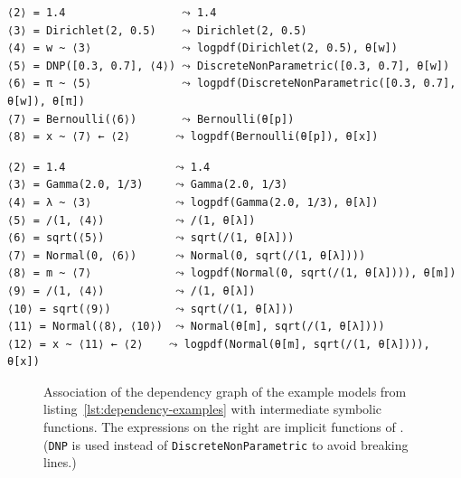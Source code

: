 \newsavebox{\bmlikelihoods}
\begin{lrbox}{\bmlikelihoods}
\begin{lstlisting}[style=lstfloat]
⟨2⟩ = 1.4                  ⤳ 1.4
⟨3⟩ = Dirichlet(2, 0.5)    ⤳ Dirichlet(2, 0.5)
⟨4⟩ = w ~ ⟨3⟩              ⤳ logpdf(Dirichlet(2, 0.5), θ[w])
⟨5⟩ = DNP([0.3, 0.7], ⟨4⟩) ⤳ DiscreteNonParametric([0.3, 0.7], θ[w])
⟨6⟩ = π ~ ⟨5⟩              ⤳ logpdf(DiscreteNonParametric([0.3, 0.7], θ[w]), θ[π])
⟨7⟩ = Bernoulli(⟨6⟩)       ⤳ Bernoulli(θ[p])
⟨8⟩ = x ~ ⟨7⟩ ← ⟨2⟩       ⤳ logpdf(Bernoulli(θ[p]), θ[x])
\end{lstlisting}
\end{lrbox}
\newsavebox{\hglikelihoods}
\begin{lrbox}{\hglikelihoods}
\begin{lstlisting}[style=lstfloat]
⟨2⟩ = 1.4                 ⤳ 1.4
⟨3⟩ = Gamma(2.0, 1/3)     ⤳ Gamma(2.0, 1/3)
⟨4⟩ = λ ~ ⟨3⟩             ⤳ logpdf(Gamma(2.0, 1/3), θ[λ])
⟨5⟩ = /(1, ⟨4⟩)           ⤳ /(1, θ[λ])
⟨6⟩ = sqrt(⟨5⟩)           ⤳ sqrt(/(1, θ[λ]))
⟨7⟩ = Normal(0, ⟨6⟩)      ⤳ Normal(0, sqrt(/(1, θ[λ])))
⟨8⟩ = m ~ ⟨7⟩             ⤳ logpdf(Normal(0, sqrt(/(1, θ[λ]))), θ[m])
⟨9⟩ = /(1, ⟨4⟩)           ⤳ /(1, θ[λ])
⟨10⟩ = sqrt(⟨9⟩)          ⤳ sqrt(/(1, θ[λ]))
⟨11⟩ = Normal(⟨8⟩, ⟨10⟩)  ⤳ Normal(θ[m], sqrt(/(1, θ[λ])))
⟨12⟩ = x ~ ⟨11⟩ ← ⟨2⟩    ⤳ logpdf(Normal(θ[m], sqrt(/(1, θ[λ]))), θ[x])
\end{lstlisting}
\end{lrbox}
\begin{figure}[t]
  \loosesubcaptions
  \caption{Association of the dependency graph of the example models from
    listing~\ref{lst:dependency-examples} with intermediate symbolic functions.  The expressions on
    the right are implicit functions of \protect{}.  (\texttt{DNP} is used instead of
    \texttt{DiscreteNonParametric} to avoid breaking lines.)}
  \label{fig:continuations}
\end{figure}

